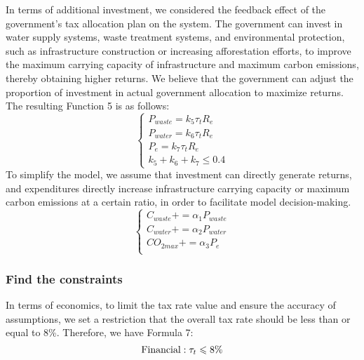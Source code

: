 \documentclass[12pt]{article}  %
\begin{document}
In terms of additional investment, we considered the feedback effect of the government's tax allocation plan on the system. The government can invest in water supply systems, waste treatment systems, and environmental protection, such as infrastructure construction or increasing afforestation efforts, to improve the maximum carrying capacity of infrastructure and maximum carbon emissions, thereby obtaining higher returns. We believe that the government can adjust the proportion of investment in actual government allocation to maximize returns. The resulting Function 5 is as follows:
\begin{equation}
	\begin{cases}
		P_{waste} = k_5\tau_tR_e\\
		P_{water} = k_6\tau_tR_e\\
		P_{e}=k_7\tau_{t}R_e \\
		k_5+k_6+k_7 \leqslant 0.4
	\end{cases}
\end{equation}
To simplify the model, we assume that investment can directly generate returns, and expenditures directly increase infrastructure carrying capacity or maximum carbon emissions at a certain ratio, in order to facilitate model decision-making.
\begin{equation}
	\begin{cases}
		C_{waste}+=\alpha_1P_{waste} \\
		C_{water}+=\alpha_2P_{water} \\
		CO_{2max}+=\alpha_3P_e \\
	\end{cases}
	\end{equation}

\subsubsection{Find the constraints}
In terms of economics, to limit the tax rate value and ensure the accuracy of assumptions, we set a restriction that the overall tax rate should be less than or equal to 8\%. Therefore, we have Formula 7:
\begin{equation}
	\text{Financial}:\tau_{t}\leqslant 8\% \\
\end{equation}
\end{document}
